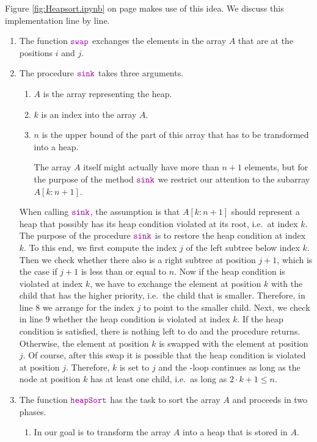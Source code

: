 Figure \ref{fig:Heapsort.ipynb} on page \pageref{fig:Heapsort.ipynb} makes use of this idea.
We discuss this implementation line by line.
\begin{enumerate}
\item The function $\mytt{swap}$ exchanges the elements in the array ${A}$ that are at the
      positions $i$ and $j$.
\item The procedure $\mytt{sink}$ takes three arguments.
      \begin{enumerate}
      \item ${A}$ is the array representing the heap.
      \item ${k}$ is an index into the array ${A}$.
      \item ${n}$ is the upper bound  of the part of this array that has to be transformed into a heap.  

            The array ${A}$ itself might actually have more than $n+1$ elements, but for the
            purpose of the method $\mytt{sink}$ we restrict our attention to the subarray
            ${A[k:n+1]}$. 
      \end{enumerate}
      When calling $\mytt{sink}$, the assumption is that $A[{k:n+1}]$ should represent a heap 
      that possibly has its heap condition violated at its root, i.e.~at index ${k}$.  The
      purpose of the procedure $\mytt{sink}$ is to restore the heap condition at index ${k}$.
      To this end, we first compute the index ${j}$ of the left subtree below index ${k}$.
      Then we check whether there also is a right subtree at position ${j}+1$, which is the
      case if $j + 1$ is less than or equal to  ${n}$.  Now if the heap condition is violated at index
      ${k}$, we have to exchange the element at  position ${k}$ with the child that has
      the higher priority, i.e.~the child that is smaller. Therefore, in line 8 we arrange for the index
      ${j}$ to point to the smaller child.  Next, we check in line 9 whether the heap
      condition is violated at index ${k}$.  If the heap condition is satisfied, there is
      nothing left to do and the procedure returns.  Otherwise, the element at position ${k}$ is swapped with
      the element at position ${j}$.  Of course, after this swap it is possible that the heap condition is
      violated at position ${j}$.  Therefore,  ${k}$ is set to ${j}$ and the -loop continues
      as long as the node at position ${k}$ has at least one child, i.e.~as long as 
      $2 \cdot {k} + 1 \leq {n}$.
\item The function $\mytt{heapSort}$ has the task to sort the array ${A}$ and proceeds in two phases.
      \begin{enumerate}
      \item In  our goal is to transform the array ${A}$ into a heap that is stored in ${A}$.


\end{enumerate}
\end{enumerate}
